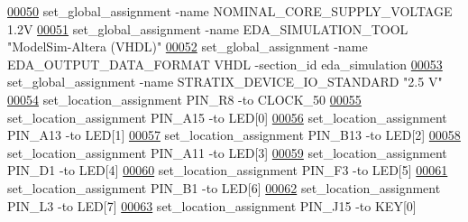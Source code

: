 \begin{DoxyCode}
\hypertarget{_d_e0___n_a_n_o___v_f_8qsf_source_l00050}{}\hyperlink{_d_e0___n_a_n_o___v_f_8qsf_a35065386cc8fb5cbcc42e9e1083d14b7}{00050} set\_global\_assignment -name NOMINAL\_CORE\_SUPPLY\_VOLTAGE \textcolor{vhdllogic}{1}.2V
\hypertarget{_d_e0___n_a_n_o___v_f_8qsf_source_l00051}{}\hyperlink{_d_e0___n_a_n_o___v_f_8qsf_a9b34d84e231e437391c53496179a9ff5}{00051} set\_global\_assignment -name EDA\_SIMULATION\_TOOL "ModelSim-Altera (VHDL)"
\hypertarget{_d_e0___n_a_n_o___v_f_8qsf_source_l00052}{}\hyperlink{_d_e0___n_a_n_o___v_f_8qsf_aefa188e124805b4c730a8c853abf4718}{00052} set\_global\_assignment -name EDA\_OUTPUT\_DATA\_FORMAT VHDL -section\_id eda\_simulation
\hypertarget{_d_e0___n_a_n_o___v_f_8qsf_source_l00053}{}\hyperlink{_d_e0___n_a_n_o___v_f_8qsf_a29cb98513ae5be1eb159c9879a03d59a}{00053} set\_global\_assignment -name STRATIX\_DEVICE\_IO\_STANDARD "2.\textcolor{vhdllogic}{5} V"
\hypertarget{_d_e0___n_a_n_o___v_f_8qsf_source_l00054}{}\hyperlink{_d_e0___n_a_n_o___v_f_8qsf_a0e03e03f9fbf4ac0f76029da0590e281}{00054} set\_location\_assignment PIN\_R8 -to CLOCK\_50
\hypertarget{_d_e0___n_a_n_o___v_f_8qsf_source_l00055}{}\hyperlink{_d_e0___n_a_n_o___v_f_8qsf_a8273e2706e6cca647bdd71725b735770}{00055} set\_location\_assignment PIN\_A15 -to LED[0]
\hypertarget{_d_e0___n_a_n_o___v_f_8qsf_source_l00056}{}\hyperlink{_d_e0___n_a_n_o___v_f_8qsf_a7d0a1120c29455343eda38577128d280}{00056} set\_location\_assignment PIN\_A13 -to LED[1]
\hypertarget{_d_e0___n_a_n_o___v_f_8qsf_source_l00057}{}\hyperlink{_d_e0___n_a_n_o___v_f_8qsf_a4003ac165161b04e13b2780ae755541e}{00057} set\_location\_assignment PIN\_B13 -to LED[2]
\hypertarget{_d_e0___n_a_n_o___v_f_8qsf_source_l00058}{}\hyperlink{_d_e0___n_a_n_o___v_f_8qsf_aa194e91d7cd7819bf76f85fdd55b09e3}{00058} set\_location\_assignment PIN\_A11 -to LED[3]
\hypertarget{_d_e0___n_a_n_o___v_f_8qsf_source_l00059}{}\hyperlink{_d_e0___n_a_n_o___v_f_8qsf_aaf0848ecec1d36e6612b669de77072aa}{00059} set\_location\_assignment PIN\_D1 -to LED[4]
\hypertarget{_d_e0___n_a_n_o___v_f_8qsf_source_l00060}{}\hyperlink{_d_e0___n_a_n_o___v_f_8qsf_a0e486ba1c2c2bc6a6617feb5e7fe186b}{00060} set\_location\_assignment PIN\_F3 -to LED[5]
\hypertarget{_d_e0___n_a_n_o___v_f_8qsf_source_l00061}{}\hyperlink{_d_e0___n_a_n_o___v_f_8qsf_af51dcb599a2d7027cf47db2d58a5ecd7}{00061} set\_location\_assignment PIN\_B1 -to LED[6]
\hypertarget{_d_e0___n_a_n_o___v_f_8qsf_source_l00062}{}\hyperlink{_d_e0___n_a_n_o___v_f_8qsf_a5476a9efa53311ac2022e2c1614df553}{00062} set\_location\_assignment PIN\_L3 -to LED[7]
\hypertarget{_d_e0___n_a_n_o___v_f_8qsf_source_l00063}{}\hyperlink{_d_e0___n_a_n_o___v_f_8qsf_a32b7ec56d01c704c09620327b024f010}{00063} set\_location\_assignment PIN\_J15 -to KEY[0]

\end{DoxyCode}
